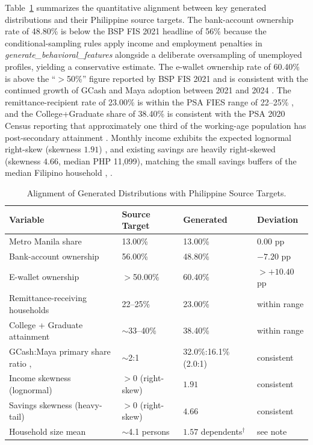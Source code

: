 \documentclass{icsthesis}
\begin{document}
\begin{mainmatter}
					Table~\ref{tab:alignment} summarizes the quantitative alignment between key generated distributions and their Philippine source targets. The bank-account ownership rate of 48.80\% is below the BSP FIS 2021 headline of 56\% \cite{ref35} because the conditional-sampling rules apply income and employment penalties in \emph{generate\_behavioral\_features} alongside a deliberate oversampling of unemployed profiles, yielding a conservative estimate. The e-wallet ownership rate of 60.40\% is above the ``$>$50\%'' figure reported by BSP FIS 2021 \cite{ref35} and is consistent with the continued growth of GCash and Maya adoption between 2021 and 2024 \cite{ref42}. The remittance-recipient rate of 23.00\% is within the PSA FIES range of 22--25\% \cite{ref40}, and the College+Graduate share of 38.40\% is consistent with the PSA 2020 Census reporting that approximately one third of the working-age population has post-secondary attainment \cite{ref39}. Monthly income exhibits the expected lognormal right-skew (skewness $1.91$) \cite{ref54}, and existing savings are heavily right-skewed (skewness $4.66$, median PHP 11{,}099), matching the small savings buffers of the median Filipino household \cite{ref35}, \cite{ref55}.

					\begin{table}[h]
					\vspace{4ex}
					\centering
					\caption{Alignment of Generated Distributions with Philippine Source Targets.}
					\label{tab:alignment}
					\footnotesize
					\begin{tabular}{|p{4cm}|p{2cm}|p{2.5cm}|p{2cm}|}
						\hline
						\textbf{Variable} & \textbf{Source Target} & \textbf{Generated} & \textbf{Deviation} \\
						\hline
						Metro Manila share \cite{ref39} & 13.00\% & 13.00\% & $0.00$ pp \\
						Bank-account ownership \cite{ref35} & 56.00\% & 48.80\% & $-7.20$ pp \\
						E-wallet ownership \cite{ref35} & $>$50.00\% & 60.40\% & $>+10.40$ pp \\
						Remittance-receiving households \cite{ref40} & 22--25\% & 23.00\% & within range \\
						College + Graduate attainment \cite{ref39} & $\sim$33--40\% & 38.40\% & within range \\
						GCash:Maya primary share ratio \cite{ref9}, \cite{ref35} & $\sim$2:1 & 32.0\%:16.1\% (2.0:1) & consistent \\
						Income skewness (lognormal) \cite{ref54} & $>0$ (right-skew) & $1.91$ & consistent \\
						Savings skewness (heavy-tail) \cite{ref55} & $>0$ (right-skew) & $4.66$ & consistent \\
						Household size mean \cite{ref39} & $\sim$4.1 persons & $1.57$ dependents$^\dagger$ & see note \\
						\hline
					\end{tabular}


\end{table}
\end{mainmatter}
\end{document}
